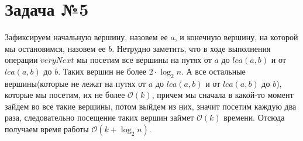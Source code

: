 \documentclass{article}
\begin{document}
\section*{Задача №5} 
Зафиксируем начальную вершину, назовем ее $a$, и конечную вершину, на которой мы остановимся, назовем ее $b$. Нетрудно заметить, что в ходе выполнения операции $veryNext$ мы посетим все вершины на путях от $a$ до $lca(a, b)$ и от $lca(a, b)$ до $b$. Таких вершин не более $2 \cdot \log_{2}{n}$. А все остальные вершины(которые не лежат на путях от $a$ до $lca(a, b)$ и от $lca(a, b)$ до $b$), которые мы посетим, их не более $\mathcal{O}(k)$, причем мы сначала в какой-то момент зайдем во все такие вершины, потом выйдем из них, значит посетим каждую два раза, следовательно посещение таких вершин займет $\mathcal{O}(k)$ времени. Отсюда получаем время работы $\mathcal{O}(k + \log_{2}{n})$.
\end{document}
